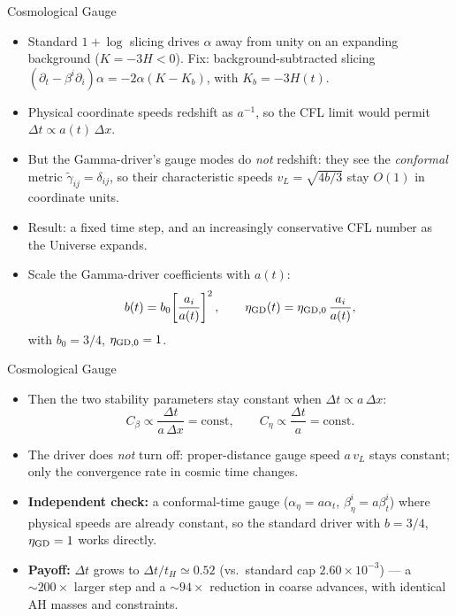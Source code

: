 \documentclass[aspectratio=169, 12pt]{beamer}
\begin{document}
\begin{frame}{Cosmological Gauge}
	\begin{itemize}
		\item Standard $1+\log$ slicing drives $\alpha$ away from
		      unity on an expanding background ($K = -3H < 0$).
		      Fix: background-subtracted slicing
		      $(\partial_t - \beta^i \partial_i)\alpha
		      = -2\alpha(K - K_b)$, with $K_b = -3H(t)$.
		\item Physical coordinate speeds redshift as $a^{-1}$, so
		      the CFL limit would permit
		      $\Delta t \propto a(t)\,\Delta x$.
		\item But the Gamma-driver's gauge modes do \emph{not}
		      redshift: they see the \emph{conformal} metric
		      $\tilde{\gamma}_{ij} = \delta_{ij}$, so their
		      characteristic speeds $v_L = \sqrt{4b/3}$ stay
		      $O(1)$ in coordinate units.
		\item Result: a fixed time step, and an increasingly
		      conservative CFL number as the Universe expands.
		\item Scale the Gamma-driver coefficients with $a(t)$:
		      \[
		          b(t) = b_0\!\left[\frac{a_i}{a(t)}\right]^2,
		          \qquad
		          \eta_{\rm GD}(t) = \eta_{\rm GD,0}\,\frac{a_i}{a(t)},
		      \]
		      with $b_0 = 3/4$, $\eta_{\rm GD,0} = 1$.
	\end{itemize}
\end{frame}
\begin{frame}{Cosmological Gauge}
	\vspace{0.5em}
	\begin{itemize}
		\item Then the two stability parameters stay constant when
		      $\Delta t \propto a\,\Delta x$:
		      \[
		          C_\beta \propto \frac{\Delta t}{a\,\Delta x}
		          = \text{const}, \qquad
		          C_\eta \propto \frac{\Delta t}{a} = \text{const}.
		      \]
		\item The driver does \emph{not} turn off: proper-distance
		      gauge speed $a\,v_L$ stays constant; only the
		      convergence rate in cosmic time changes.
		\item \textbf{Independent check:} a conformal-time gauge
		      ($\alpha_\eta = a\alpha_t$, $\beta^i_\eta = a\beta^i_t$)
		      where physical speeds are already constant, so the
		      standard driver with $b = 3/4$, $\eta_{\rm GD} = 1$
		      works directly.
		\item \textbf{Payoff:} $\Delta t$ grows to
		      $\Delta t/t_H \simeq 0.52$ (vs.\ standard cap
		      $2.60\times 10^{-3}$) — a $\sim\!200\times$ larger
		      step and a $\sim\!94\times$ reduction in coarse
		      advances, with identical AH masses and constraints.
	\end{itemize}
\end{frame}
\end{document}
